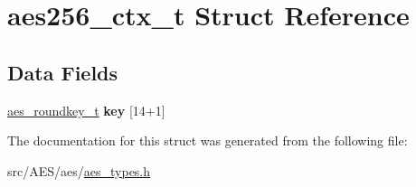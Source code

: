 \hypertarget{structaes256__ctx__t}{\section{aes256\+\_\+ctx\+\_\+t Struct Reference}
\label{structaes256__ctx__t}
}
\subsection*{Data Fields}
\begin{DoxyCompactItemize}
\item 
\hypertarget{structaes256__ctx__t_aac9ff4933a314ba93b4bec6e92199d17}{\hyperlink{structaes__roundkey__t}{aes\+\_\+roundkey\+\_\+t} {\bfseries key} \mbox{[}14+1\mbox{]}}\label{structaes256__ctx__t_aac9ff4933a314ba93b4bec6e92199d17}

\end{DoxyCompactItemize}


The documentation for this struct was generated from the following file\+:\begin{DoxyCompactItemize}
\item 
src/\+A\+E\+S/aes/\hyperlink{aes__types_8h}{aes\+\_\+types.\+h}\end{DoxyCompactItemize}
